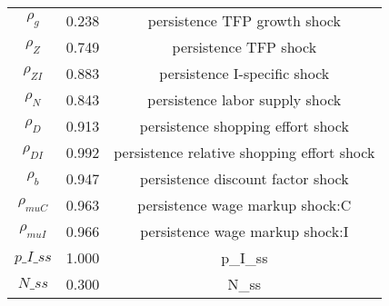 \begin{center}
\begin{longtable}{ccc}
${\rho_g}$ 	 & 	 0.238 	 & 	 persistence TFP growth shock\\
${\rho_Z}$ 	 & 	 0.749 	 & 	 persistence TFP shock\\
${\rho_{ZI}}$ 	 & 	 0.883 	 & 	 persistence I-specific shock\\
${\rho_N}$ 	 & 	 0.843 	 & 	 persistence labor supply shock\\
${\rho_D}$ 	 & 	 0.913 	 & 	 persistence shopping effort shock\\
${\rho_{DI}}$ 	 & 	 0.992 	 & 	 persistence relative shopping effort shock\\
${\rho_b}$ 	 & 	 0.947 	 & 	 persistence discount factor shock\\
${\rho_{muC}}$ 	 & 	 0.963 	 & 	 persistence wage markup shock:C\\
${\rho_{muI}}$ 	 & 	 0.966 	 & 	 persistence wage markup shock:I\\
$p\_I\_ss$ 	 & 	 1.000 	 & 	 p\_I\_ss\\
$N\_ss$ 	 & 	 0.300 	 & 	 N\_ss\\
\bottomrule%
\end{longtable}
\end{center}
